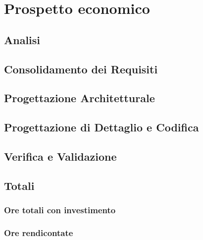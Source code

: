 \section{Prospetto economico}
	\subsection{Analisi}
	\subsection{Consolidamento dei Requisiti}
	\subsection{Progettazione Architetturale}
	\subsection{Progettazione di Dettaglio e Codifica}
	\subsection{Verifica e Validazione}
	\subsection{Totali}
		\subsubsection{Ore totali con investimento}
		\subsubsection{Ore rendicontate}
